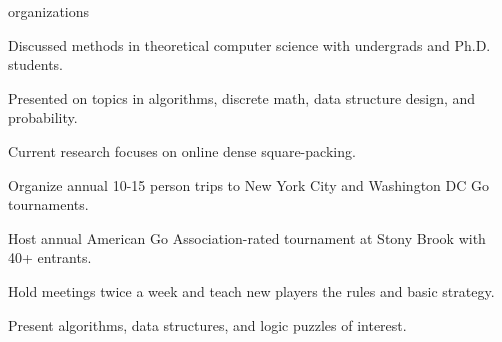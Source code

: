 \documentclass{cv}
\begin{document}
\begin{cvsection}{organizations}
  {
    \item Discussed methods in theoretical computer science with undergrads and Ph.D. students.
    \item Presented on topics in algorithms, discrete math, data structure design, and probability.
    \item Current research focuses on online dense square-packing.
  }
  {
    \item Organize annual 10-15 person trips to New York City and Washington DC Go tournaments.
    \item Host annual American Go Association-rated tournament at Stony Brook with 40+ entrants.
    \item Hold meetings twice a week and teach new players the rules and basic strategy.
  }
  {
    \item Present algorithms, data structures, and logic puzzles of interest.
  } 
\end{cvsection}
%
%
\end{document}
